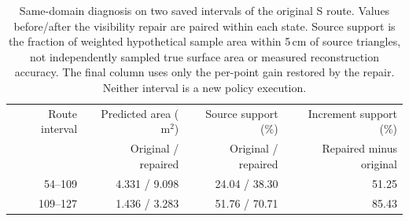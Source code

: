 \begin{table}[!htbp]
\centering\small
\caption{Same-domain diagnosis on two saved intervals of the original S route.
Values before/after the visibility repair are paired within each state.
Source support is the fraction of weighted hypothetical sample area within 5\,cm
of source triangles, not independently sampled true surface area or measured reconstruction accuracy.
The final column uses only the per-point gain restored by the repair.
Neither interval is a new policy execution.}\label{tab:repair-prediction-match}
\begin{tabular}{@{}rrrr@{}}
\toprule
Route interval & Predicted area ($\mathrm{m}^2$) & Source support (\%) & Increment support (\%) \\
& Original / repaired & Original / repaired & Repaired minus original \\
\midrule
54--109 & 4.331 / 9.098 & 24.04 / 38.30 & 51.25 \\
109--127 & 1.436 / 3.283 & 51.76 / 70.71 & 85.43 \\
\bottomrule
\end{tabular}
\end{table}

